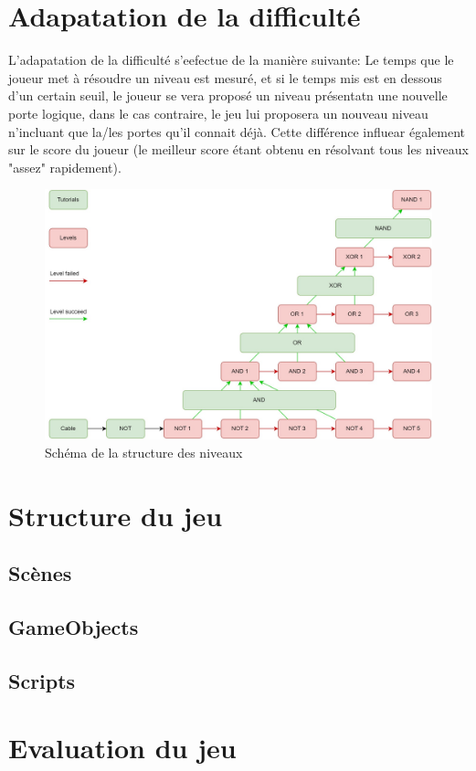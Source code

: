 \documentclass{article}
\begin{document}
\section{Adapatation de la difficulté}
L'adapatation de la difficulté s'eefectue de la manière suivante: Le temps que le joueur met à résoudre un niveau est mesuré, et si le temps mis est en dessous d'un certain seuil, le joueur se vera proposé un niveau présentatn une nouvelle porte logique, dans le cas contraire, le jeu lui proposera un nouveau niveau n'incluant que la/les portes qu'il connait déjà. Cette différence influear également sur le score du joueur (le meilleur score étant obtenu en résolvant tous les niveaux "assez" rapidement).\\

\begin{figure}[h]
    \centering
    \includegraphics[width=\textwidth]{img/Levels Tree.jpg}
    \caption{Schéma de la structure des niveaux}
\end{figure}

\section{Structure du jeu}
    \subsection{Scènes}

    \subsection{GameObjects}    
    \subsection{Scripts}

\section{Evaluation du jeu}
    
\end{document}
